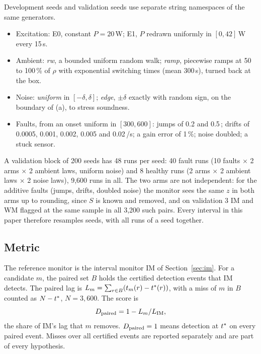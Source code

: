 Development seeds and validation seeds use separate string namespaces of the same generators.
\begin{itemize}
\item Excitation: E0, constant $P = 20$\,W; E1, $P$ redrawn uniformly in $[0,42]$\,W every 15\,s.
\item Ambient: \emph{rw}, a bounded uniform random walk; \emph{ramp}, piecewise ramps at 50 to 100\,\% of $\rho$ with
  exponential switching times (mean 300\,s), turned back at the box.
\item Noise: \emph{uniform} in $[-\delta,\delta]$; \emph{edge}, $\pm\delta$ exactly with random sign, on the boundary of
  (a), to stress soundness.
\item Faults, from an onset uniform in $[300,600]$: jumps of 0.2 and 0.5\,\degC; drifts of 0.0005, 0.001, 0.002, 0.005
  and 0.02\,\degC/s; a gain error of 1\,\%; noise doubled; a stuck sensor.
\end{itemize}
A validation block of 200 seeds has 48 runs per seed: 40 fault runs (10 faults $\times$ 2 arms $\times$ 2 ambient laws,
uniform noise) and 8 healthy runs (2 arms $\times$ 2 ambient laws $\times$ 2 noise laws), 9,600 runs in all. The two
arms are not independent: for the additive faults (jumps, drifts, doubled noise) the monitor sees the same $z$ in both
arms up to rounding, since $S$ is known and removed, and on validation 3 IM and WM flagged at the same sample in all
3,200 such pairs. Every interval in this paper therefore resamples seeds, with all runs of a seed together.

\subsection{Metric}

The reference monitor is the interval monitor IM of Section~\ref{sec:im}. For a candidate $m$, the paired set $B$ holds
the certified detection events that IM detects. The paired lag is $L_m = \sum_{r\in B}(t_m(r)-t^{\ast}(r))$, with a miss
of $m$ in $B$ counted as $N-t^{\ast}$, $N = 3{,}600$. The score is
\[
D_{\mathrm{paired}} = 1 - L_m/L_{\mathrm{IM}},
\]
the share of IM's lag that $m$ removes. $D_{\mathrm{paired}} = 1$ means detection at $t^{\ast}$ on every paired event. Misses over all
certified events are reported separately and are part of every hypothesis.



